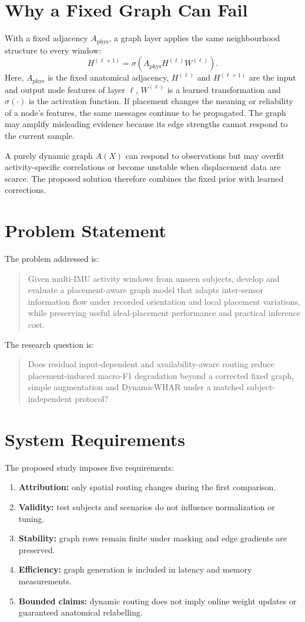 \documentclass[12pt,a4paper,twoside,openright]{report}
\begin{document}
\section{Why a Fixed Graph Can Fail}
With a fixed adjacency $A_{\mathrm{phys}}$, a graph layer applies the same neighbourhood structure to every window:
\[
H^{(\ell+1)}=\sigma\!\left(A_{\mathrm{phys}}H^{(\ell)}W^{(\ell)}\right).
\]
Here, $A_{\mathrm{phys}}$ is the fixed anatomical adjacency, $H^{(\ell)}$ and $H^{(\ell+1)}$ are the input and output node features of layer $\ell$, $W^{(\ell)}$ is a learned transformation and $\sigma(\cdot)$ is the activation function. If placement changes the meaning or reliability of a node's features, the same messages continue to be propagated. The graph may amplify misleading evidence because its edge strengths cannot respond to the current sample.

A purely dynamic graph $A(X)$ can respond to observations but may overfit activity-specific correlations or become unstable when displacement data are scarce. The proposed solution therefore combines the fixed prior with learned corrections.

\section{Problem Statement}
The problem addressed is:
\begin{quote}
Given multi-IMU activity windows from unseen subjects, develop and evaluate a placement-aware graph model that adapts inter-sensor information flow under recorded orientation and local placement variations, while preserving useful ideal-placement performance and practical inference cost.
\end{quote}

The research question is:
\begin{quote}
Does residual input-dependent and availability-aware routing reduce placement-induced macro-F1 degradation beyond a corrected fixed graph, simple augmentation and DynamicWHAR under a matched subject-independent protocol?
\end{quote}

\section{System Requirements}
The proposed study imposes five requirements:
\begin{enumerate}
\item \textbf{Attribution:} only spatial routing changes during the first comparison.
\item \textbf{Validity:} test subjects and scenarios do not influence normalization or tuning.
\item \textbf{Stability:} graph rows remain finite under masking and edge gradients are preserved.
\item \textbf{Efficiency:} graph generation is included in latency and memory measurements.
\item \textbf{Bounded claims:} dynamic routing does not imply online weight updates or guaranteed anatomical relabelling.
\end{enumerate}
\end{document}

